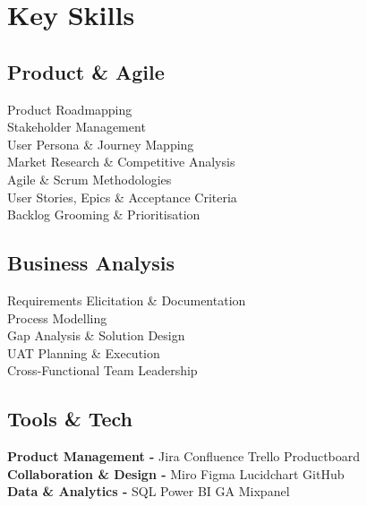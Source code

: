 \documentclass[]{deedy-resume-reversed}
\begin{document}
\begin{minipage}[t]{0.33\textwidth}

\section{Key Skills}

\subsection{Product \& Agile}
Product Roadmapping\\
Stakeholder Management\\
User Persona \& Journey Mapping\\
Market Research \& Competitive Analysis\\
Agile \& Scrum Methodologies\\
User Stories, Epics \& Acceptance Criteria\\
Backlog Grooming \& Prioritisation\\

\sectionsep

\subsection{Business Analysis}
Requirements Elicitation \& Documentation\\
Process Modelling\\
Gap Analysis \& Solution Design\\
UAT Planning \& Execution\\
Cross-Functional Team Leadership\\
\sectionsep

\subsection{Tools \& Tech}

\textbf{Product Management -} Jira \textbullet{} Confluence \textbullet{} Trello \textbullet{} Productboard\\
\textbf{Collaboration \& Design -} Miro \textbullet{} Figma \textbullet{} Lucidchart \textbullet{} GitHub\\
\textbf{Data \& Analytics -} SQL \textbullet{} Power BI \textbullet{} GA \textbullet{} Mixpanel\\
\sectionsep



\end{minipage}
\end{document}
